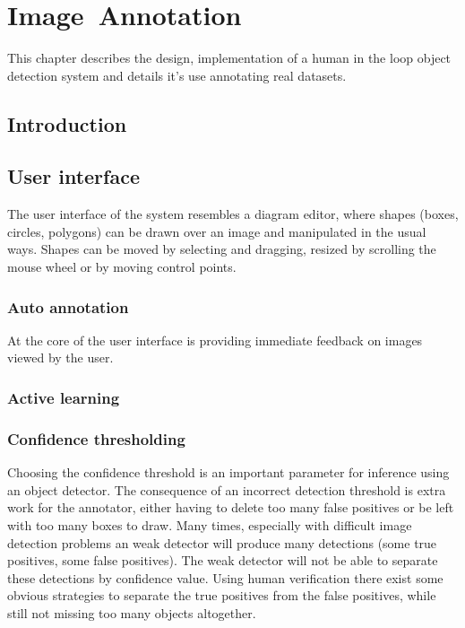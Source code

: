\chapter{Image~Annotation}
\label{chap:annotation} 

This chapter describes the design, implementation of a human in the loop object detection system and details it's use annotating real datasets.

\section{Introduction}

\section {User interface}

The user interface of the system resembles a diagram editor, where shapes (boxes, circles, polygons) can be drawn over an image and manipulated in the usual ways. Shapes can be moved by selecting and dragging, resized by scrolling the mouse wheel or by moving control points. 


\subsection {Auto annotation}

At the core of the user interface is providing immediate feedback on images viewed by the user.


\subsection{Active learning}


\subsection {Confidence thresholding}

Choosing the confidence threshold is an important parameter for inference using an object detector. The consequence of an incorrect detection threshold is extra work for the annotator, either having to delete too many false positives or be left with too many boxes to draw. Many times, especially with difficult image detection problems an weak detector will produce many detections (some true positives, some false positives). The weak detector will not be able to separate these detections by confidence value. Using human verification there exist some obvious strategies to separate the true positives from the false positives, while still not missing too many objects altogether. 

